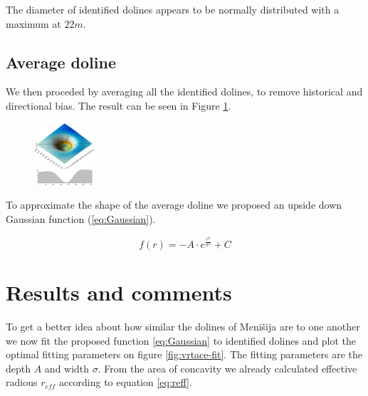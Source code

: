 \documentclass[a0,portrait]{a0poster}
\begin{document}
\begin{multicols}{2}
\vspace{5mm}
The diameter of identified dolines appears to be normally distributed with a maximum at $22m$.


\subsection*{Average doline}

We then proceded by averaging all the identified dolines, to remove historical and directional bias. The result can be seen in Figure \ref{fig:vrtaca}.

\begin{figure}
\begin{center}
	\includegraphics[width=0.2\textwidth]{menisija-vrtaca.png}
	\label{fig:vrtaca}
\end{center}
\end{figure}

To approximate the shape of the average doline we proposed an upside down Gaussian function (\ref{eq:Gaussian}).

\begin{equation}
	f(r) = - A \cdot e^{\frac{r^2}{\sigma^2}} + C
	\label{eq:Gaussian}
\end{equation}


\section*{Results and comments}

To get a better idea about how similar the dolines of Menišija are to one another we now fit the proposed function \ref{eq:Gaussian} to identified dolines and plot the optimal fitting parameters on figure \ref{fig:vrtace-fit}. The fitting parameters are the depth $A$ and width $\sigma$. From the area of concavity we already calculated effective radious $r_{eff}$ according to equation \ref{eq:reff}.


\end{multicols}
\end{document}
